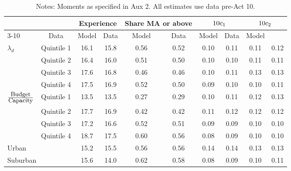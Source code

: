 \documentclass[notitlepage,12pt]{article}%
\begin{document}
\begin{table}[ptb]
\caption{Model Validation: Average District Employee Characteristics (pre-Act
10)}%
\label{tab:modelfit_aux3_pre}
\begin{tabular}
[c]{lccccccccc}\hline\hline
\multicolumn{2}{l}{} & \multicolumn{2}{c}{{\small Experience}} &
\multicolumn{2}{c}{{\small Share MA or above}} &
\multicolumn{2}{c}{${\small 10c}_{1}$} & \multicolumn{2}{c}{${\small 10c}_{2}%
$}\\\cline{3-10}%
\multicolumn{2}{l}{{\small District Group \ \ \ \ \ \ }} & {\small Data} &
{\small Model} & {\small Data} & {\small Model} & {\small Data} &
{\small Model} & {\small Data} & {\small Model}\\\hline
$\lambda_{d}$ & {\small Quintile 1} & {\small 16.1} & {\small 15.8} &
{\small 0.56} & {\small 0.52} & {\small 0.10} & {\small 0.11} & {\small 0.11}
& {\small 0.12}\\
\multicolumn{1}{r}{} & {\small Quintile 2} & {\small 16.4} & {\small 16.0} &
{\small 0.51} & {\small 0.50} & {\small 0.10} & {\small 0.10} & {\small 0.11}
& {\small 0.11}\\
\multicolumn{1}{r}{} & {\small Quintile 3} & {\small 17.6} & {\small 16.8} &
{\small 0.46} & {\small 0.46} & {\small 0.10} & {\small 0.11} & {\small 0.13}
& {\small 0.13}\\
\multicolumn{1}{r}{} & {\small Quintile 4} & {\small 17.5} & {\small 16.9} &
{\small 0.52} & {\small 0.50} & {\small 0.09} & {\small 0.10} & {\small 0.10}
& {\small 0.11}\\
$\frac{\text{{\small Budget}}}{\text{{\small Capacity}}}$ & {\small Quintile
1} & {\small 13.5} & {\small 13.5} & {\small 0.27} & {\small 0.29} &
{\small 0.10} & {\small 0.11} & {\small 0.12} & {\small 0.13}\\
\multicolumn{1}{r}{} & {\small Quintile 2} & {\small 17.7} & {\small 16.9} &
{\small 0.42} & {\small 0.42} & {\small 0.11} & {\small 0.12} & {\small 0.12}
& {\small 0.12}\\
\multicolumn{1}{r}{} & {\small Quintile 3} & {\small 17.2} & {\small 16.6} &
{\small 0.52} & {\small 0.51} & {\small 0.09} & {\small 0.09} & {\small 0.10}
& {\small 0.10}\\
\multicolumn{1}{r}{} & {\small Quintile 4} & {\small 18.7} & {\small 17.5} &
{\small 0.60} & {\small 0.56} & {\small 0.08} & {\small 0.09} & {\small 0.10}
& {\small 0.10}\\
\multicolumn{2}{l}{{\small Urban}} & {\small 15.2} & {\small 15.5} &
{\small 0.56} & {\small 0.56} & {\small 0.14} & {\small 0.14} & {\small 0.13}
& {\small 0.13}\\
\multicolumn{2}{l}{{\small Suburban}} & {\small 15.6} & {\small 14.0} &
{\small 0.62} & {\small 0.58} & {\small 0.08} & {\small 0.09} & {\small 0.10}
& {\small 0.11}\\\hline\hline
\end{tabular}
\caption*{{\footnotesize Notes: Moments as specified in Aux 2. All
estimates use data pre-Act 10.}}
\end{table}
\end{document}
